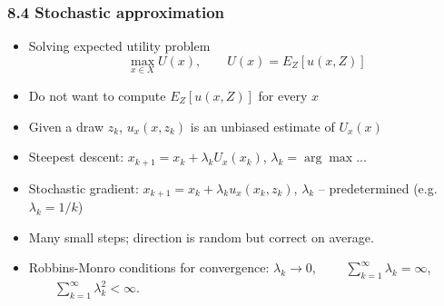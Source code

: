 \documentclass[bigger,handout]{beamer}
\newenvironment{stepitemize}{\begin{itemize}[<+->]}{\end{itemize} }
\begin{document}
\begin{frame}%

\frametitle{8.4 Stochastic approximation}

\begin{stepitemize}
\item Solving expected utility problem%
\begin{equation*}
\max_{x\in X}U(x),\qquad U(x)=E_{Z}[u(x,Z)]
\end{equation*}

\item Do not want to compute $E_{Z}[u(x,Z)]$ for every $x$

\item Given a draw $z_{k}$, $u_{x}(x,z_{k})$ is an unbiased estimate of $%
U_{x}(x)$

\item Steepest descent: $x_{k+1}=x_{k}+\lambda _{k}U_{x}(x_{k})$, $\lambda
_{k}=\arg \max $...

\item Stochastic gradient: $x_{k+1}=x_{k}+\lambda _{k}u_{x}(x_{k},z_{k})$, 
\newline
$\lambda _{k}$ -- predetermined (e.g. $\lambda _{k}=1/k$)

\item Many small steps; direction is random but correct on average.

\item Robbins-Monro conditions for convergence: \newline
$\lambda _{k}\rightarrow 0$, $\qquad \sum_{k=1}^{\infty }\lambda _{k}=\infty 
$, $\qquad \sum_{k=1}^{\infty }\lambda _{k}^{2}<\infty $.
\end{stepitemize}


\end{frame}%
\end{document}
